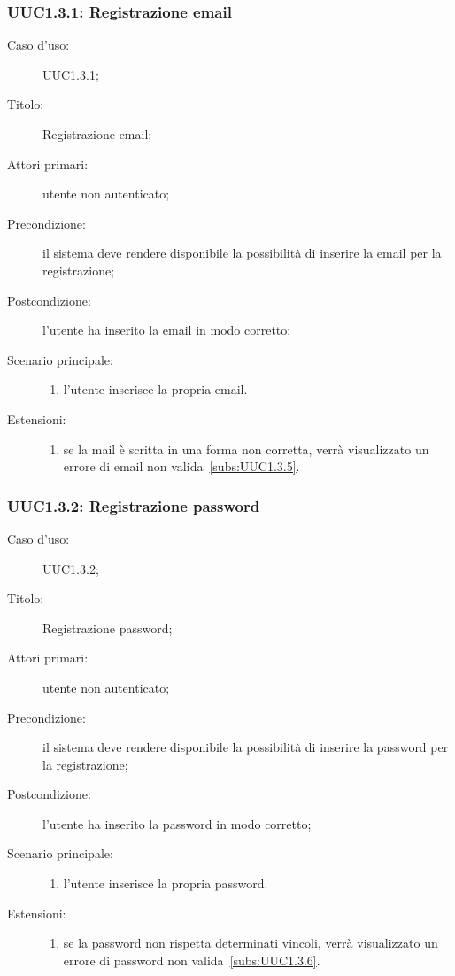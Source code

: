 \documentclass[../../../analisi-dei-requisiti.tex]{subfiles}
\begin{document}
\subsubsection{UUC1.3.1: Registrazione email}%
\label{subs:UUC1.3.1}
\begin{description}
  \item[Caso d'uso:] UUC1.3.1;
  \item[Titolo:] Registrazione email;
  \item[Attori primari:] utente non autenticato;
  \item[Precondizione:] il sistema deve rendere disponibile la possibilità di inserire la email per la registrazione;
  \item[Postcondizione:] l'utente ha inserito la email in modo corretto;
  \item[Scenario principale:]
        \begin{enumerate}
          \item l'utente inserisce la propria email.
        \end{enumerate}
  \item[Estensioni:]
        \begin{enumerate}
          \item se la mail è scritta in una forma non corretta, verrà visualizzato un errore di email non valida~\ref{subs:UUC1.3.5}.
        \end{enumerate}
\end{description}



\subsubsection{UUC1.3.2: Registrazione password}%
\label{subs:UUC1.3.2}
\begin{description}
  \item[Caso d'uso:] UUC1.3.2;
  \item[Titolo:] Registrazione password;
  \item[Attori primari:] utente non autenticato;
  \item[Precondizione:] il sistema deve rendere disponibile la possibilità di inserire la password per la registrazione;
  \item[Postcondizione:] l'utente ha inserito la password in modo corretto;
  \item[Scenario principale:]
        \begin{enumerate}
          \item l'utente inserisce la propria password.
        \end{enumerate}
  \item[Estensioni:]
        \begin{enumerate}
          \item se la password non rispetta determinati vincoli, verrà visualizzato un errore di password non valida~\ref{subs:UUC1.3.6}.
        \end{enumerate}
\end{description}
\end{document}
